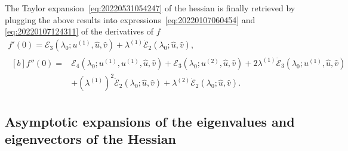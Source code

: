 \documentclass[12pt, final]{scrartcl}
\theoremstyle{definition}
\newcommand{\E}{\mathcal E}
\newcommand{\order}[2][1]{#2^{(#1)}}
\begin{document}
The Taylor expansion~\eqref{eq:20220531054247} of the hessian is finally
retrieved by plugging the above results into
expressions~\eqref{eq:20220107060454} and \eqref{eq:20220107124311} of the
derivatives of $f$
\begin{gather*}
  f'(0) = \E_3(\lambda_0; \order[1]u, \hat{u}, \hat{v}) + \order[1]\lambda \dot{\E}_2(\lambda_0; \hat{u}, \hat{v}),\\
  \begin{aligned}[b]
    f''(0) = {} & \E_4(\lambda_0; \order[1]u, \order[1]u, \hat{u}, \hat{v}) + \E_3(\lambda_0; \order[2]u, \hat{u}, \hat{v}) + 2\order[1]\lambda \dot{\E}_3(\lambda_0; \order[1]u, \hat{u}, \hat{v})\\
                & + ( \order[1]\lambda )^2 \ddot{\E}_2(\lambda_0; \hat{u}, \hat{v}) + \order[2]\lambda \dot{\E}_2(\lambda_0; \hat{u}, \hat{v}).
  \end{aligned}
\end{gather*}

\subsection{Asymptotic expansions of the eigenvalues and eigenvectors of the Hessian}
\label{sec:20220616074108}
\end{document}
